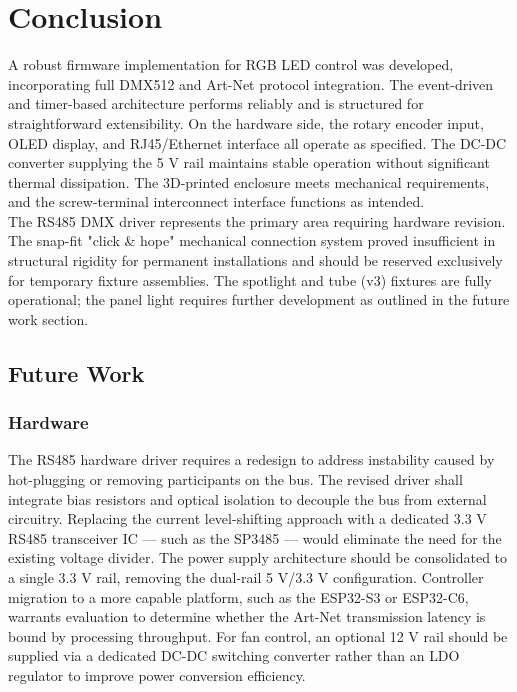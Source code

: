\section{Conclusion}
\label{sec:conclusion}
A robust firmware implementation for \ac{RGB} \ac{LED} control was developed, incorporating full \ac{DMX}512 and Art-Net protocol integration. The event-driven and timer-based architecture performs reliably and is structured for straightforward extensibility. On the hardware side, the rotary encoder input, \ac{OLED} display, and RJ45/Ethernet interface all operate as specified. The \ac{DC}-\ac{DC} converter supplying the 5 V rail maintains stable operation without significant thermal dissipation. The 3D-printed enclosure meets mechanical requirements, and the screw-terminal interconnect interface functions as intended. \\

The \ac{RS485} \ac{DMX} driver represents the primary area requiring hardware revision. The snap-fit "click \& hope" mechanical connection system proved insufficient in structural rigidity for permanent installations and should be reserved exclusively for temporary fixture assemblies. The spotlight and tube (v3) fixtures are fully operational; the panel light requires further development as outlined in the future work section.

\subsection{Future Work}
\subsubsection{Hardware}
The \ac{RS485} hardware driver requires a redesign to address instability caused by hot-plugging or removing participants on the bus. The revised driver shall integrate bias resistors and optical isolation to decouple the bus from external circuitry. Replacing the current level-shifting approach with a dedicated 3.3 V \ac{RS485} transceiver IC — such as the SP3485 — would eliminate the need for the existing voltage divider. The power supply architecture should be consolidated to a single 3.3 V rail, removing the dual-rail 5 V/3.3 V configuration. Controller migration to a more capable platform, such as the ESP32-S3 or ESP32-C6, warrants evaluation to determine whether the Art-Net transmission latency is bound by processing throughput. For fan control, an optional 12 V rail should be supplied via a dedicated \ac{DC}-\ac{DC} switching converter rather than an \ac{LDO} regulator to improve power conversion efficiency.

